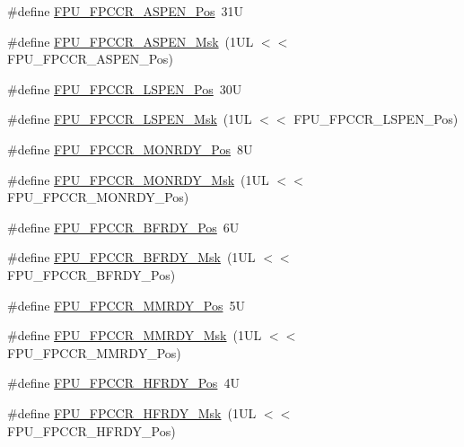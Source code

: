 \begin{DoxyCompactItemize}
\item 
\#define \hyperlink{group___c_m_s_i_s___f_p_u_ga4228a923ddf665f868e56b4b9e9bff7b}{F\+P\+U\+\_\+\+F\+P\+C\+C\+R\+\_\+\+A\+S\+P\+E\+N\+\_\+\+Pos}~31U
\item 
\#define \hyperlink{group___c_m_s_i_s___f_p_u_ga309886ff6bbd25cb13c061c6683c6c0c}{F\+P\+U\+\_\+\+F\+P\+C\+C\+R\+\_\+\+A\+S\+P\+E\+N\+\_\+\+Msk}~(1\+U\+L $<$$<$ F\+P\+U\+\_\+\+F\+P\+C\+C\+R\+\_\+\+A\+S\+P\+E\+N\+\_\+\+Pos)
\item 
\#define \hyperlink{group___c_m_s_i_s___f_p_u_gac7d70e051fe759ad8fed83bf5b5aebc1}{F\+P\+U\+\_\+\+F\+P\+C\+C\+R\+\_\+\+L\+S\+P\+E\+N\+\_\+\+Pos}~30U
\item 
\#define \hyperlink{group___c_m_s_i_s___f_p_u_gaf4ab19de45df6522dd882bc116f938e9}{F\+P\+U\+\_\+\+F\+P\+C\+C\+R\+\_\+\+L\+S\+P\+E\+N\+\_\+\+Msk}~(1\+U\+L $<$$<$ F\+P\+U\+\_\+\+F\+P\+C\+C\+R\+\_\+\+L\+S\+P\+E\+N\+\_\+\+Pos)
\item 
\#define \hyperlink{group___c_m_s_i_s___f_p_u_gae0a4effc79209d821ded517c2be326ba}{F\+P\+U\+\_\+\+F\+P\+C\+C\+R\+\_\+\+M\+O\+N\+R\+D\+Y\+\_\+\+Pos}~8U
\item 
\#define \hyperlink{group___c_m_s_i_s___f_p_u_ga42067729a887081cf56b8fe1029be7a1}{F\+P\+U\+\_\+\+F\+P\+C\+C\+R\+\_\+\+M\+O\+N\+R\+D\+Y\+\_\+\+Msk}~(1\+U\+L $<$$<$ F\+P\+U\+\_\+\+F\+P\+C\+C\+R\+\_\+\+M\+O\+N\+R\+D\+Y\+\_\+\+Pos)
\item 
\#define \hyperlink{group___c_m_s_i_s___f_p_u_ga6d633920f92c3ce4133d769701619b17}{F\+P\+U\+\_\+\+F\+P\+C\+C\+R\+\_\+\+B\+F\+R\+D\+Y\+\_\+\+Pos}~6U
\item 
\#define \hyperlink{group___c_m_s_i_s___f_p_u_gad349eb1323d8399d54a04c0bfd520cb2}{F\+P\+U\+\_\+\+F\+P\+C\+C\+R\+\_\+\+B\+F\+R\+D\+Y\+\_\+\+Msk}~(1\+U\+L $<$$<$ F\+P\+U\+\_\+\+F\+P\+C\+C\+R\+\_\+\+B\+F\+R\+D\+Y\+\_\+\+Pos)
\item 
\#define \hyperlink{group___c_m_s_i_s___f_p_u_gaccdb481211629f9440431439231187f1}{F\+P\+U\+\_\+\+F\+P\+C\+C\+R\+\_\+\+M\+M\+R\+D\+Y\+\_\+\+Pos}~5U
\item 
\#define \hyperlink{group___c_m_s_i_s___f_p_u_gadedfaec9fdd07261573e823a4dcfb5c4}{F\+P\+U\+\_\+\+F\+P\+C\+C\+R\+\_\+\+M\+M\+R\+D\+Y\+\_\+\+Msk}~(1\+U\+L $<$$<$ F\+P\+U\+\_\+\+F\+P\+C\+C\+R\+\_\+\+M\+M\+R\+D\+Y\+\_\+\+Pos)
\item 
\#define \hyperlink{group___c_m_s_i_s___f_p_u_gab12733991487acc2da41ca300fe36fb6}{F\+P\+U\+\_\+\+F\+P\+C\+C\+R\+\_\+\+H\+F\+R\+D\+Y\+\_\+\+Pos}~4U
\item 
\#define \hyperlink{group___c_m_s_i_s___f_p_u_gaf4beaa279abff34828344bd594fff8a1}{F\+P\+U\+\_\+\+F\+P\+C\+C\+R\+\_\+\+H\+F\+R\+D\+Y\+\_\+\+Msk}~(1\+U\+L $<$$<$ F\+P\+U\+\_\+\+F\+P\+C\+C\+R\+\_\+\+H\+F\+R\+D\+Y\+\_\+\+Pos)

\end{DoxyCompactItemize}
